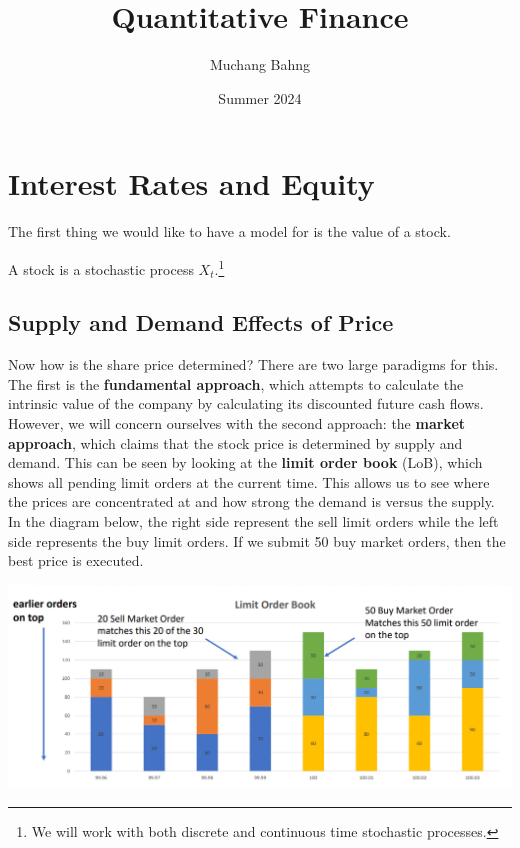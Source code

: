 \documentclass{article}
\begin{document}
\title{Quantitative Finance}
\author{Muchang Bahng}
\date{Summer 2024}

\maketitle
\tableofcontents
\pagebreak

\section{Interest Rates and Equity}

  The first thing we would like to have a model for is the value of a stock. 

  \begin{definition}
    A stock is a stochastic process $X_t$.\footnote{We will work with both discrete and continuous time stochastic processes.}
  \end{definition}

  \subsection{Supply and Demand Effects of Price}

    Now how is the share price determined? There are two large paradigms for this. The first is the \textbf{fundamental approach}, which attempts to calculate the intrinsic value of the company by calculating its discounted future cash flows. However, we will concern ourselves with the second approach: the \textbf{market approach}, which claims that the stock price is determined by supply and demand. This can be seen by looking at the \textbf{limit order book} (LoB), which shows all pending limit orders at the current time. This allows us to see where the prices are concentrated at and how strong the demand is versus the supply. In the diagram below, the right side represent the sell limit orders while the left side represents the buy limit orders. If we submit 50 buy market orders, then the best price is executed. 

    \begin{center}
      \includegraphics[scale=0.3]{img/limit_order_book.png}
    \end{center}
\end{document}
